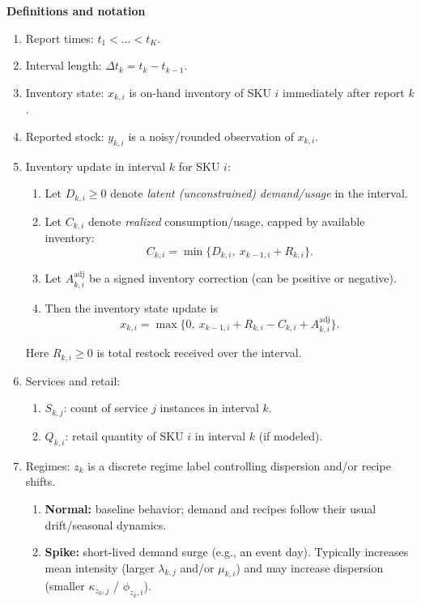 \documentclass[11pt]{article}
\begin{document}
\textbf{Definitions and notation}
\begin{enumerate}
  \item Report times: $t_1 < \dots < t_K$.
  \item Interval length: $\Delta t_k = t_k - t_{k-1}$.
  \item Inventory state: $x_{k,i}$ is on-hand inventory of SKU $i$ immediately after report $k$.
  \item Reported stock: $y_{k,i}$ is a noisy/rounded observation of $x_{k,i}$.
  \item Inventory update in interval $k$ for SKU $i$:
  \begin{enumerate}
    \item Let $D_{k,i}\ge 0$ denote \emph{latent (unconstrained) demand/usage} in the interval.
    \item Let $C_{k,i}$ denote \emph{realized} consumption/usage, capped by available inventory:
    \[
      C_{k,i} = \min\bigl\{D_{k,i},\ x_{k-1,i} + R_{k,i}\bigr\}.
    \]
    \item Let $A^{\mathrm{adj}}_{k,i}$ be a signed inventory correction (can be positive or negative).
    \item Then the inventory state update is
    \[
      x_{k,i} = \max\bigl\{0,\ x_{k-1,i} + R_{k,i} - C_{k,i} + A^{\mathrm{adj}}_{k,i}\bigr\}.
    \]
  \end{enumerate}
  Here $R_{k,i}\ge 0$ is total restock received over the interval.

  \item Services and retail:
  \begin{enumerate}
    \item $S_{k,j}$: count of service $j$ instances in interval $k$.
    \item $Q_{k,i}$: retail quantity of SKU $i$ in interval $k$ (if modeled).
  \end{enumerate}
  \item Regimes: $z_k$ is a discrete regime label controlling dispersion and/or recipe shifts.
  \begin{enumerate}
    \item \textbf{Normal:} baseline behavior; demand and recipes follow their usual drift/seasonal dynamics.

    \item \textbf{Spike:} short-lived demand surge (e.g., an event day). Typically increases mean intensity (larger $\lambda_{k,j}$ and/or $\mu_{k,i}$) and may increase dispersion (smaller $\kappa_{z_k,j}$ / $\phi_{z_k,i}$).


\end{enumerate}
\end{enumerate}
\end{document}
